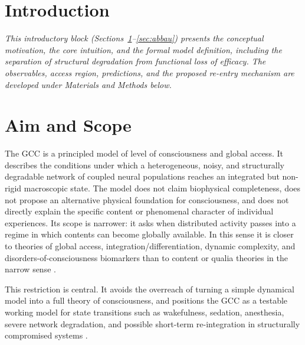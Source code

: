 ﻿\documentclass[11pt,a4paper]{article}
\theoremstyle{plain}
\theoremstyle{definition}
\theoremstyle{remark}
\begin{document}
\newpage
\tableofcontents
\newpage

\section*{Introduction}

\noindent\textit{This introductory block (Sections~\ref{sec:ziel}--\ref{sec:abbau}) presents the conceptual motivation, the core intuition, and the formal model definition, including the separation of structural degradation from functional loss of efficacy. The observables, access region, predictions, and the proposed re-entry mechanism are developed under Materials and Methods below.}

\section{Aim and Scope}
\label{sec:ziel}

The GCC is a principled model of level of consciousness and global access. It describes the conditions under which a heterogeneous, noisy, and structurally degradable network of coupled neural populations reaches an integrated but non-rigid macroscopic state. The model does not claim biophysical completeness, does not propose an alternative physical foundation for consciousness, and does not directly explain the specific content or phenomenal character of individual experiences. Its scope is narrower: it asks when distributed activity passes into a regime in which contents can become globally available. In this sense it is closer to theories of global access, integration/differentiation, dynamic complexity, and disorders-of-consciousness biomarkers than to content or qualia theories in the narrow sense \citep{baars2005,dehaene1998,dehaene2001,dehaenechangeux2011,tononi2004,mashour2020,boly2013,casali2013,sitt2014,king2013,laureys2004,owen2006,giacino2018,naccache2018}.

This restriction is central. It avoids the overreach of turning a simple dynamical model into a full theory of consciousness, and positions the GCC as a testable working model for state transitions such as wakefulness, sedation, anesthesia, severe network degradation, and possible short-term re-integration in structurally compromised systems \citep{alkire2008,purdon2013,giacino2018}.
\end{document}
